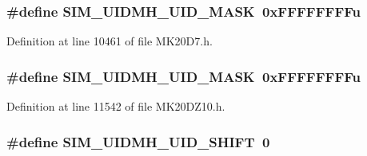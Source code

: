 \subsubsection[{\texorpdfstring{S\+I\+M\+\_\+\+U\+I\+D\+M\+H\+\_\+\+U\+I\+D\+\_\+\+M\+A\+SK}{SIM_UIDMH_UID_MASK}}]{\setlength{\rightskip}{0pt plus 5cm}\#define S\+I\+M\+\_\+\+U\+I\+D\+M\+H\+\_\+\+U\+I\+D\+\_\+\+M\+A\+SK~0x\+F\+F\+F\+F\+F\+F\+F\+Fu}\hypertarget{group___s_i_m___register___masks_ga38dffcb27b09a015e2f2e7812d42477c}{}\label{group___s_i_m___register___masks_ga38dffcb27b09a015e2f2e7812d42477c}


Definition at line 10461 of file M\+K20\+D7.\+h.

\subsubsection[{\texorpdfstring{S\+I\+M\+\_\+\+U\+I\+D\+M\+H\+\_\+\+U\+I\+D\+\_\+\+M\+A\+SK}{SIM_UIDMH_UID_MASK}}]{\setlength{\rightskip}{0pt plus 5cm}\#define S\+I\+M\+\_\+\+U\+I\+D\+M\+H\+\_\+\+U\+I\+D\+\_\+\+M\+A\+SK~0x\+F\+F\+F\+F\+F\+F\+F\+Fu}\hypertarget{group___s_i_m___register___masks_ga38dffcb27b09a015e2f2e7812d42477c}{}\label{group___s_i_m___register___masks_ga38dffcb27b09a015e2f2e7812d42477c}


Definition at line 11542 of file M\+K20\+D\+Z10.\+h.

\subsubsection[{\texorpdfstring{S\+I\+M\+\_\+\+U\+I\+D\+M\+H\+\_\+\+U\+I\+D\+\_\+\+S\+H\+I\+FT}{SIM_UIDMH_UID_SHIFT}}]{\setlength{\rightskip}{0pt plus 5cm}\#define S\+I\+M\+\_\+\+U\+I\+D\+M\+H\+\_\+\+U\+I\+D\+\_\+\+S\+H\+I\+FT~0}\hypertarget{group___s_i_m___register___masks_ga56b83da182908eb5c406181b72870e54}{}\label{group___s_i_m___register___masks_ga56b83da182908eb5c406181b72870e54}



